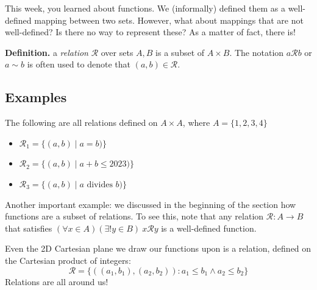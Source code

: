 \documentclass{article}
\begin{document}
    This week, you learned about functions. We (informally) defined them as a well-defined mapping between two sets. However, what about mappings that are not well-defined? Is there no way to represent these? As a matter of fact, there is!
    
    \vspace{3mm}
    \textbf{Definition.} a \textit{relation} $\mathcal{R}$ over sets $A, B$ is a subset of $A \times B$. The notation $a\mathcal{R}b$ or $a \sim b$ is often used to denote that $(a, b) \in \mathcal{R}$.

    \subsection*{Examples}
    
    The following are all relations defined on $A \times A$, where $A = \{1, 2, 3, 4\}$
        \begin{itemize}
            \item $\mathcal{R}_1 = \{(a, b) \mid a = b)\}$
            \item $\mathcal{R}_2 = \{(a, b) \mid a+b \le 2023)\}$
            \item $\mathcal{R}_3 = \{(a, b) \mid a \text{ divides } b)\}$
        \end{itemize}
        Another important example: we discussed in the beginning of the section how functions are a subset of relations. To see this, note that any relation $\mathcal{R} \colon A \rightarrow B$ that satisfies $(\forall x \in A)(\exists! y \in B) \ x \mathcal{R}y$ is a well-defined function.

        \vspace{2mm}
        Even the 2D Cartesian plane we draw our functions upon is a relation, defined on the Cartesian product of integers:
    $$\mathcal{R} = \{((a_{1}, b_{1}), (a_{2}, b_{2})) : a_{1} \le b_{1} \land  a_{2} \le b_{2}\}$$
        Relations are all around us!
    
\end{document}
